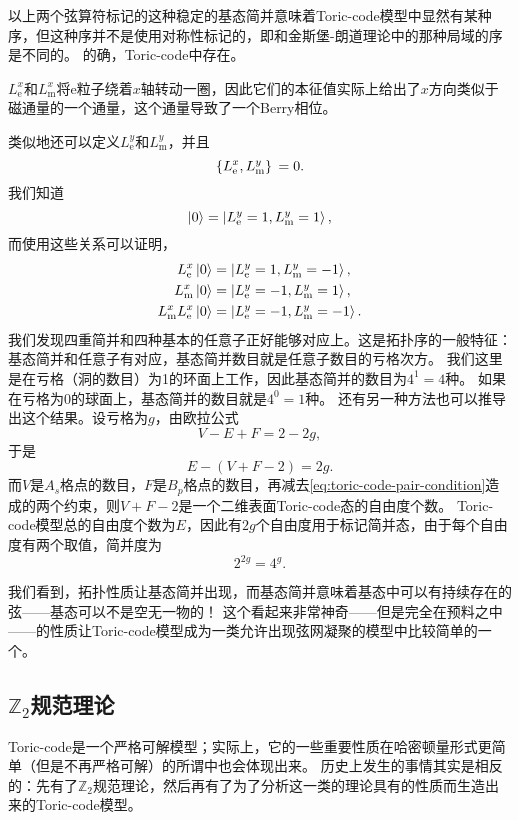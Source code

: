 以上两个弦算符标记的这种稳定的基态简并意味着Toric-code模型中显然有某种序，但这种序并不是使用对称性标记的，即和金斯堡-朗道理论中的那种局域的序是不同的。
的确，Toric-code中存在。

${L}^x_\text{e}$和${L}^x_\text{m}$将e粒子绕着$x$轴转动一圈，因此它们的本征值实际上给出了$x$方向类似于磁通量的一个通量，这个通量导致了一个Berry相位。

类似地还可以定义${L}^y_\text{e}$和${L}^y_\text{m}$，并且
\begin{equation}
    \acomm*{{L}^x_\text{e}}{{L}^y_\text{m}} = 0.
\end{equation}
我们知道
\begin{equation}
    \ket{0} = \ket{L_\text{e}^y=1, L_\text{m}^y=1},
\end{equation}
而使用这些关系可以证明，
\begin{equation}
    \begin{aligned}
        {L}^x_\text{e} \ket{0} &= \ket{L_\text{e}^y=1, L_\text{m}^y=-1}, \\
        {L}^x_\text{m} \ket{0} &= \ket{L_\text{e}^y=-1, L_\text{m}^y=1}, \\
        {L}^x_\text{m} {L}^x_\text{e} \ket{0} &= \ket{L_\text{e}^y=-1, L_\text{m}^y=-1}.
    \end{aligned}
\end{equation}
我们发现四重简并和四种基本的任意子正好能够对应上。这是拓扑序的一般特征：基态简并和任意子有对应，基态简并数目就是任意子数目的亏格次方。
我们这里是在亏格（洞的数目）为1的环面上工作，因此基态简并的数目为$4^1=4$种。
如果在亏格为0的球面上，基态简并的数目就是$4^0=1$种。
还有另一种方法也可以推导出这个结果。设亏格为$g$，由欧拉公式
\[
    V - E + F = 2 - 2g,
\]
于是
\[
    E - (V + F - 2) = 2g.
\]
而$V$是$A_s$格点的数目，$F$是$B_p$格点的数目，再减去\eqref{eq:toric-code-pair-condition}造成的两个约束，则$V+F-2$是一个二维表面Toric-code态的自由度个数。
Toric-code模型总的自由度个数为$E$，因此有$2g$个自由度用于标记简并态，由于每个自由度有两个取值，简并度为
\[
    2^{2g} = 4^g.
\]

我们看到，拓扑性质让基态简并出现，而基态简并意味着基态中可以有持续存在的弦——基态可以不是空无一物的！
这个看起来非常神奇——但是完全在预料之中——的性质让Toric-code模型成为一类允许出现弦网凝聚的模型中比较简单的一个。

\subsection{$\mathbb{Z}_2$规范理论}

Toric-code是一个严格可解模型；实际上，它的一些重要性质在哈密顿量形式更简单（但是不再严格可解）的所谓中也会体现出来。
历史上发生的事情其实是相反的：先有了$\mathbb{Z}_2$规范理论，然后再有了为了分析这一类的理论具有的性质而生造出来的Toric-code模型。

